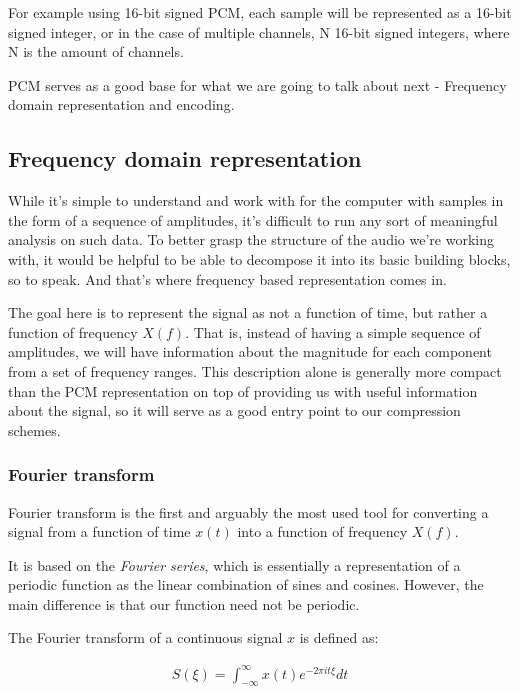 For example using 16-bit signed PCM, each sample will be represented as a 16-bit signed integer, or in the case of multiple channels, N 16-bit signed integers, where N is the amount of channels.

PCM serves as a good base for what we are going to talk about next - Frequency domain representation and encoding.

\subsection{Frequency domain representation}
While it's simple to understand and work with for the computer with samples in the form of a sequence of amplitudes, it's difficult to run any sort of meaningful analysis on such data. To better grasp the structure of the audio we're working with, it would be helpful to be able to decompose it into its basic building blocks, so to speak. And that's where frequency based representation comes in.

The goal here is to represent the signal as not a function of time, but rather a function of frequency $X(f)$. That is, instead of having a simple sequence of amplitudes, we will have information about the magnitude for each component from a set of frequency ranges. This description alone is generally more compact than the PCM representation \cite{bosi_goldberg_2003} on top of providing us with useful information about the signal, so it will serve as a good entry point to our compression schemes.

\subsubsection{Fourier transform}
Fourier transform is the first and arguably the most used tool for converting a signal from a function of time $x(t)$ into a function of frequency $X(f)$.

It is based on the \emph{Fourier series}, which is essentially a representation of a periodic function as the linear combination of sines and cosines. \cite{Shatkay:1995:FTP:864947} However, the main difference is that our function need not be periodic.

The Fourier transform of a continuous signal $x$ is defined as: \cite{Recoskie2014ConstrainedNM}

\begin{align}
S(\xi) = \int_{-\infty}^{\infty}x(t)e^{-2\pi it\xi}dt
\end{align}


